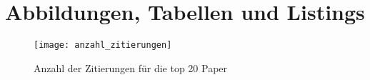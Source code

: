 \newpage
\appendix

\chapter{Abbildungen, Tabellen und Listings}\label{ch:results}

\begin{figure}[ht]

    \texttt{[image: anzahl\_zitierungen]}
  \caption[]{Anzahl der Zitierungen für die top 20 Paper}
\label{fig:paperrank}
\end{figure}




